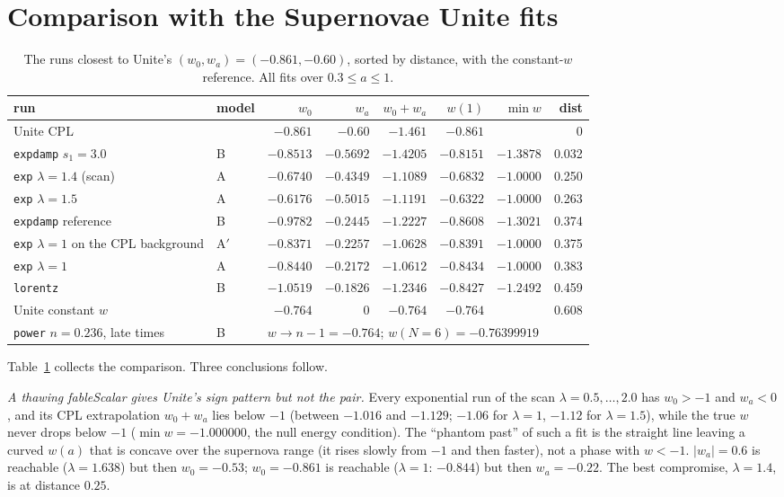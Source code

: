 \documentclass[11pt,a4paper]{article}
\newcommand{\fableScalar}{\textsf{fableScalar}}
\begin{document}
\FloatBarrier
\section{Comparison with the Supernovae Unite fits}\label{sec:unite}

\begin{table}[htbp]
\centering\small
\caption{The runs closest to Unite's $(w_0,w_a)=(-0.861,-0.60)$, sorted by distance, with the
constant-$w$ reference. All fits over $0.3\le a\le1$.}
\label{tab:unite}
\setlength{\tabcolsep}{4pt}
\begin{tabular}{@{}l l r r r r r r@{}}
\toprule
run & model & $w_0$ & $w_a$ & $w_0+w_a$ & $w(1)$ & $\min w$ & dist \\
\midrule
Unite CPL & & $-0.861$ & $-0.60$ & $-1.461$ & $-0.861$ & & 0 \\
\texttt{expdamp} $s_1=3.0$ & B & $-0.8513$ & $-0.5692$ & $-1.4205$ & $-0.8151$ & $-1.3878$ & 0.032 \\
\texttt{exp} $\lambda=1.4$ (scan) & A & $-0.6740$ & $-0.4349$ & $-1.1089$ & $-0.6832$ & $-1.0000$ & 0.250 \\
\texttt{exp} $\lambda=1.5$ & A & $-0.6176$ & $-0.5015$ & $-1.1191$ & $-0.6322$ & $-1.0000$ & 0.263 \\
\texttt{expdamp} reference & B & $-0.9782$ & $-0.2445$ & $-1.2227$ & $-0.8608$ & $-1.3021$ & 0.374 \\
\texttt{exp} $\lambda=1$ on the CPL background & A$'$ & $-0.8371$ & $-0.2257$ & $-1.0628$ & $-0.8391$ & $-1.0000$ & 0.375 \\
\texttt{exp} $\lambda=1$ & A & $-0.8440$ & $-0.2172$ & $-1.0612$ & $-0.8434$ & $-1.0000$ & 0.383 \\
\texttt{lorentz} & B & $-1.0519$ & $-0.1826$ & $-1.2346$ & $-0.8427$ & $-1.2492$ & 0.459 \\
\midrule
Unite constant $w$ & & $-0.764$ & $0$ & $-0.764$ & $-0.764$ & & 0.608 \\
\texttt{power} $n=0.236$, late times & B & \multicolumn{6}{l}{$w\to n-1=-0.764$; $w(N=6)=-0.76399919$} \\
\bottomrule
\end{tabular}
\end{table}

Table~\ref{tab:unite} collects the comparison. Three conclusions follow.

\emph{A thawing \fableScalar{} gives Unite's sign pattern but not the pair.} Every exponential
run of the scan $\lambda=0.5,\dots,2.0$ has $w_0>-1$ and $w_a<0$, and its CPL extrapolation
$w_0+w_a$ lies below $-1$ (between $-1.016$ and $-1.129$; $-1.06$ for $\lambda=1$, $-1.12$ for
$\lambda=1.5$), while the true $w$ never drops below
$-1$ ($\min w=-1.000000$, the null energy condition). The ``phantom past'' of such a fit is the
straight line leaving a curved $w(a)$ that is concave over the supernova range (it rises slowly
from $-1$ and then faster), not a phase with $w<-1$. $|w_a|=0.6$ is reachable
($\lambda=1.638$) but then $w_0=-0.53$; $w_0=-0.861$ is reachable ($\lambda=1$: $-0.844$) but
then $w_a=-0.22$. The best compromise, $\lambda=1.4$, is at distance $0.25$.
\end{document}

